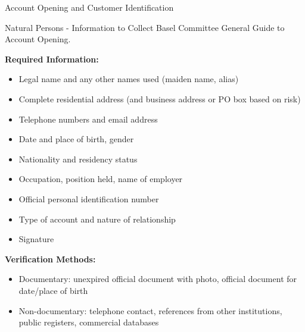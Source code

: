 \documentclass[11pt,a4paper]{beamer}
\begin{document}
	\begin{frame}{Account Opening and Customer Identification}
		\begin{block}{Natural Persons - Information to Collect}
			Basel Committee General Guide to Account Opening.
		\end{block}
		\textbf{Required Information:}
		\begin{itemize}
			\item Legal name and any other names used (maiden name, alias)
			\item Complete residential address (and business address or PO box based on risk)
			\item Telephone numbers and email address
			\item Date and place of birth, gender
			\item Nationality and residency status
			\item Occupation, position held, name of employer
			\item Official personal identification number
			\item Type of account and nature of relationship
			\item Signature
		\end{itemize}
		\textbf{Verification Methods:}
		\begin{itemize}
			\item Documentary: unexpired official document with photo, official document for date/place of birth
			\item Non-documentary: telephone contact, references from other institutions, public registers, commercial databases
		\end{itemize}
	\end{frame}
	
\end{document}

